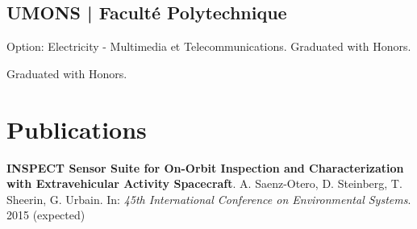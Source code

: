 \documentclass[a4paper]{deedy-resume} %
\begin{document}
\begin{minipage}[t]{0.73\textwidth}

\subsection{UMONS | Faculté Polytechnique}
\vspace{2pt}
Option: Electricity - Multimedia et Telecommunications.
Graduated with Honors.

\vspace{3pt}
Graduated with Honors.





\section{Publications}
\textbf{INSPECT Sensor Suite for On-Orbit Inspection and Characterization with Extravehicular Activity Spacecraft}. 
A. Saenz-Otero, D. Steinberg, T. Sheerin, G. Urbain. In: \textit{45th International Conference on Environmental Systems}. 2015 (expected)

\end{minipage} %








\end{document}
